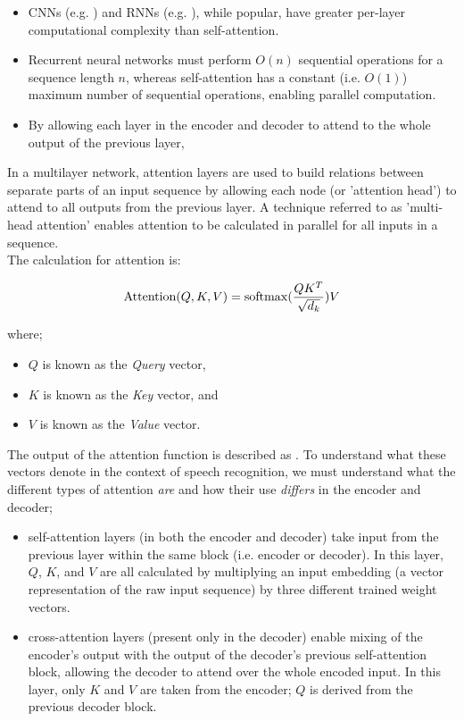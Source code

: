 \begin{itemize}
        \item CNNs (e.g. \cite{zeghidour2018fully}) and RNNs (e.g. \cite{graves2014towards}), while popular, have greater per-layer computational complexity than self-attention\cite{vaswani2017attention}.
        \item Recurrent neural networks must perform $O(n)$ sequential operations for a sequence length $n$, whereas self-attention has a constant (i.e. $O(1)$) maximum number of sequential operations, enabling parallel computation\cite{vaswani2017attention}.
        \item By allowing each layer in the encoder and decoder to attend to the whole output of the previous layer, 
\end{itemize}

In a multilayer network, attention layers are used to build relations between separate parts of an input sequence by allowing each node (or 'attention head'\cite{shaw2018self}) to attend to all outputs from the previous layer.
A technique referred to as 'multi-head attention'\cite{vaswani2017attention} enables attention to be calculated in parallel for all inputs in a sequence.\\

The calculation for attention is:

\[ \text{Attention}(Q,K,V) = \operatorname{softmax} (\frac{QK^T}{\sqrt{d_k}})V \]

where;

\begin{itemize}
        \item $Q$ is known as the \emph{Query} vector,
        \item $K$ is known as the \emph{Key} vector, and
        \item $V$ is known as the \emph{Value} vector.
\end{itemize}

The output of the attention function is described as \cite{vaswani2017attention}.
To understand what these vectors denote in the context of speech recognition, we must understand what the different types of attention \emph{are} and how their use \emph{differs} in the encoder and decoder;

\begin{itemize}
        \item self-attention layers (in both the encoder and decoder) take input from the previous layer within the same block (i.e. encoder or decoder).
        In this layer, $Q$, $K$, and $V$ are all calculated by multiplying an input embedding (a vector representation of the raw input sequence) by three different trained weight vectors.
        \item cross-attention layers (present only in the decoder) enable mixing of the encoder's output with the output of the decoder's previous self-attention block, allowing the decoder to attend over the whole encoded input.
        In this layer, only $K$ and $V$ are taken from the encoder; $Q$ is derived from the previous decoder block.
\end{itemize}

